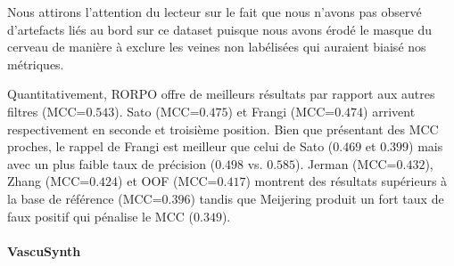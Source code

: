 Nous attirons l'attention du lecteur sur le fait que nous n'avons pas observé d'artefacts liés au bord sur ce dataset puisque nous avons érodé le masque du cerveau de manière à exclure les veines non labélisées qui auraient biaisé nos métriques. 

Quantitativement, RORPO offre de meilleurs résultats par rapport aux autres filtres (MCC=$0.543$). Sato (MCC=$0.475$) et Frangi (MCC=$0.474$) arrivent respectivement en seconde et troisième position. Bien que présentant des MCC proches, le rappel de Frangi est meilleur que celui de Sato  ($0.469$ et $0.399$) mais avec un plus faible taux de précision ($0.498$ vs. $0.585$). Jerman (MCC=$0.432$), Zhang (MCC=$0.424$) et OOF (MCC=$0.417$) montrent des résultats supérieurs à la base de référence (MCC=$0.396$) tandis que Meijering produit un fort taux de faux positif qui pénalise le MCC ($0.349$).



\paragraph{VascuSynth}


